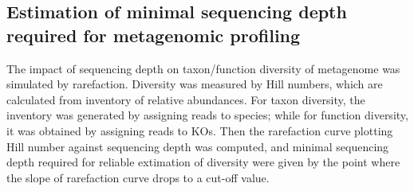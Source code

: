 \documentclass[11pt]{article}
\begin{document}
    \subsection{Estimation of minimal sequencing depth required for metagenomic profiling}
    The impact of sequencing depth on taxon/function diversity of metagenome was simulated by rarefaction. 
    Diversity was measured by Hill numbers, which are calculated from inventory of relative abundances. 
    For taxon diversity, the inventory was generated by assigning reads to species; while for function diversity, it was obtained by assigning reads to KOs. 
    Then the rarefaction curve plotting Hill number against sequencing depth was computed, and minimal sequencing depth required for reliable extimation of diversity were given by the point where the slope of rarefaction curve drops to a cut-off value.
\end{document}
